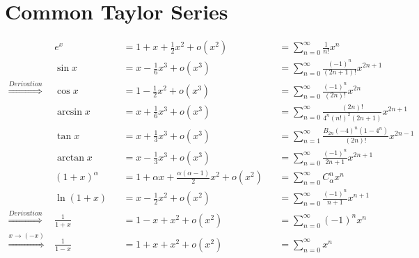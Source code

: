 \documentclass{article}
\begin{document}
	\large
	\setlength{\baselineskip}{4em}
	
	\renewcommand{\d}[1][x]{\ \text{d}#1}
	
	\section*{Common Taylor Series}
	
	\begin{align}
		& e^x & & = 1 + x + \frac{1}{2} x^2 + o(x^2) && = \sum_{n = 0}^{\infty} \frac{1}{n!} x^n
		\\
		& \sin x & & = x - \frac{1}{6} x^3 + o(x^3) && = \sum_{n = 0}^{\infty} \frac{(-1)^n}{(2n + 1)!} x^{2n + 1}
		\\
		\stackrel{Derivation}{\Longrightarrow} \ & \cos x & & = 1 - \frac{1}{2} x^2 + o(x^3) && = \sum_{n = 0}^{\infty} \frac{(-1)^n}{(2n)!} x^{2n}
		\\
		& \arcsin x & & = x + \frac{1}{6} x^3 + o(x^3) && = \sum_{n = 0}^{\infty} \frac{(2n)!}{4^n (n!)^2 (2n + 1)} x^{2n + 1}
		\\
		& \tan x & & = x + \frac{1}{3} x^3 + o(x^3) && = \sum_{n = 1}^{\infty} \frac{B_{2n} (-4)^n (1 - 4^n)}{(2n)!} x^{2n - 1}
		\\
		& \arctan x & & = x - \frac{1}{3} x^3 + o(x^3) && = \sum_{n = 0}^{\infty} \frac{(-1)^n}{2n + 1} x^{2n + 1}
		\\
		& (1 + x)^\alpha & & = 1 + \alpha x + \frac{\alpha (\alpha - 1)}{2} x^2 + o(x^2) && = \sum_{n = 0}^{\infty} C_{\alpha}^{n} x^n
		\\
		& \ln{(1 + x)} & & = x - \frac{1}{2} x^2 + o(x^2) && = \sum_{n = 0}^{\infty} \frac{(-1)^n}{n + 1} x^{n + 1}
		\\
		\stackrel{Derivation}{\Longrightarrow} \ & \frac{1}{1 + x} & & = 1 - x + x^2 + o(x^2) && = \sum_{n = 0}^{\infty} (-1)^n x^n
		\\
		\stackrel{x \rightarrow (-x)}{\Longrightarrow} \ & \frac{1}{1 - x} & & = 1 + x + x^2 + o(x^2) && = \sum_{n = 0}^{\infty} x^n
	\end{align}
\end{document}
